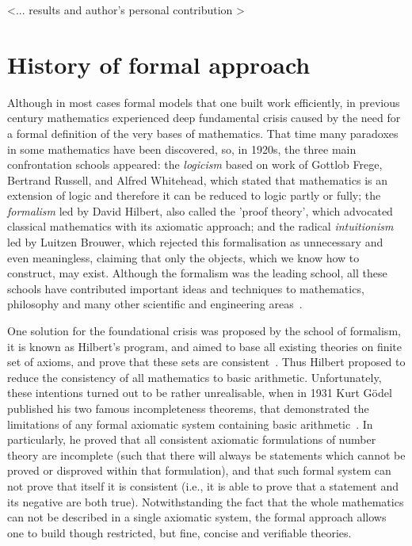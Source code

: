 \documentclass[article]{aaltoseries}
\begin{document}
<... results and author's personal contribution >


\section{History of formal approach}
\label{sec:formal_history}

Although in most cases formal models that one built work efficiently, in previous century mathematics experienced deep fundamental crisis caused by the need for a formal definition of the very bases of mathematics. That time many paradoxes in some mathematics have been discovered, so, in 1920s, the three main confrontation schools appeared:
the \textit{logicism} based on work of Gottlob Frege, Bertrand Russell, and Alfred Whitehead, which stated that mathematics is an extension of logic and therefore it can be reduced to logic partly or fully;
the \textit{formalism} led by David Hilbert, also called the 'proof theory', which advocated classical mathematics with its axiomatic approach;
and the radical \textit{intuitionism} led by Luitzen Brouwer, which rejected this formalisation as unnecessary and even meaningless, claiming that only the objects, which we know how to construct, may exist.
Although the formalism was the leading school, all these schools have contributed important ideas and techniques to mathematics, philosophy and many other scientific and engineering areas~\cite{Fer08}.

One solution for the foundational crisis was proposed by the school of formalism, it is known as Hilbert's program, and aimed to base all existing theories on finite set of axioms, and prove that these sets are consistent~\cite{Zac06}. Thus Hilbert proposed to reduce the consistency of all mathematics to basic arithmetic. 
Unfortunately, these intentions turned out to be rather unrealisable, when in 1931 Kurt Gödel published his two famous incompleteness theorems, that demonstrated the limitations of any formal axiomatic system containing basic arithmetic~\cite{Raa15}. In particularly, he proved that all consistent axiomatic formulations of number theory are incomplete (such that there will always be statements which cannot be proved or disproved within that formulation), and that such formal system can not prove that itself it is consistent (i.e., it is able to prove that a statement and its negative are both true).
Notwithstanding the fact that the whole mathematics can not be described in a single axiomatic system, the formal approach allows one to build though restricted, but fine, concise and verifiable theories.
\end{document}

